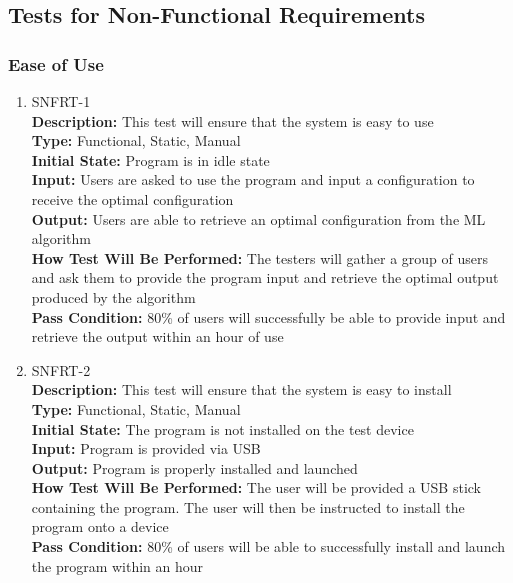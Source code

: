 \documentclass[12pt, titlepage]{article}
\begin{document}
\subsection{Tests for Non-Functional Requirements}

\subsubsection{Ease of Use}
\begin{enumerate}
    \item{SNFRT-1\\}
    \textbf{Description:} This test will ensure that the system is easy to use\\
    \textbf{Type:} Functional, Static, Manual\\
    \textbf{Initial State:} Program is in idle state\\
    \textbf{Input:} Users are asked to use the program and input a configuration to receive the optimal configuration\\
    \textbf{Output:} Users are able to retrieve an optimal configuration from the ML algorithm\\
    \textbf{How Test Will Be Performed:} The testers will gather a group of users and ask them to provide the program input and retrieve the optimal output produced by the algorithm\\
    \textbf{Pass Condition:} 80\% of users will successfully be able to provide input and retrieve the output within an hour of use\\

    \item{SNFRT-2\\}
    \textbf{Description:} This test will ensure that the system is easy to install\\
    \textbf{Type:} Functional, Static, Manual\\
    \textbf{Initial State:} The program is not installed on the test device\\
    \textbf{Input:} Program is provided via USB\\
    \textbf{Output:} Program is properly installed and launched\\
    \textbf{How Test Will Be Performed:} The user will be provided a USB stick containing the program. The user will then be instructed to install the program onto a device\\
    \textbf{Pass Condition:} 80\% of users will be able to successfully install and launch the program within an hour\\
\end{enumerate}
\end{document}
